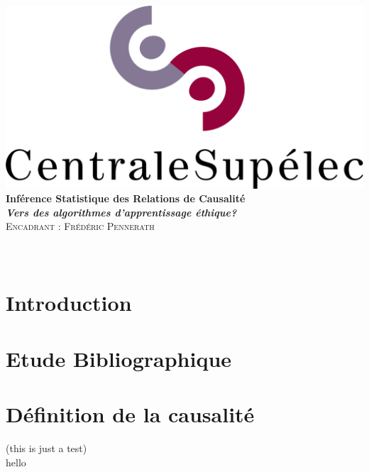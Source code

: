 \documentclass{article}
\author{\Large \textsc{Mohammed FELLAJI, Ahmed BEN AISSA}}
\date{September, 2020}
\begin{document}
\hypersetup{pdfborder=0 0 0} 		%


\makeatletter
  \begin{titlepage}
  \centering
     {\large \textsc{   }}\\
     \vspace{1em}
    \centering
      \includegraphics[width=0.5 \textwidth]{figures/LogoCS.png} \\
    \vspace{4cm}
      {\LARGE\textbf{Inférence Statistique des Relations de Causalité}\\
       \vspace{1em}
       {\large\textbf{
       \textit{\LARGE{Vers des algorithmes d'apprentissage éthique?}}}}\\
    \vspace{4cm}
    \centering
     {\Large \textsc{Encadrant : Frédéric Pennerath}}\\
     \vspace{1em}
        {\Large \@author} \\
        \vspace{3em}
        {\Large \@date} }\\
  \end{titlepage}
\makeatother


\tableofcontents




\newpage
\section{Introduction}

\newpage
\section{Etude Bibliographique}


\newpage
\section{Définition de la causalité}
(this is just a test) \\
hello\cite{rubin2005causal}

\newpage

\end{document}
